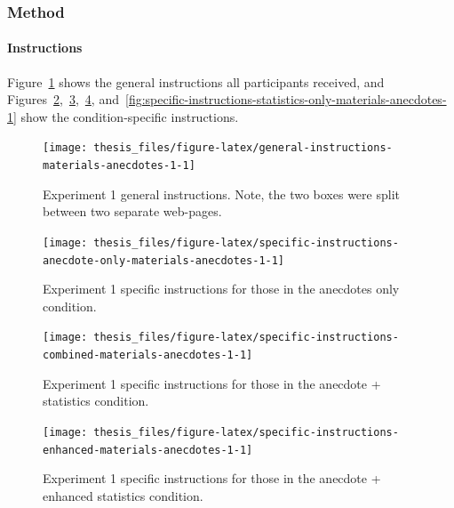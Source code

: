 \documentclass[a4paper, nobind, dvipsnames]{templates/ociamthesis}
\theoremstyle{definition}
\theoremstyle{definition}
\theoremstyle{definition}
\theoremstyle{definition}
\theoremstyle{remark}
\begin{document}
\subsubsection{Method}

\hypertarget{instructions-materials-anecdotes-1-appendix}{%
\paragraph{Instructions}\label{instructions-materials-anecdotes-1-appendix}}

Figure~\ref{fig:general-instructions-materials-anecdotes-1} shows the general
instructions all participants received, and
Figures~\ref{fig:specific-instructions-anecdote-only-materials-anecdotes-1},~\ref{fig:specific-instructions-combined-materials-anecdotes-1},~\ref{fig:specific-instructions-enhanced-materials-anecdotes-1},
and~\ref{fig:specific-instructions-statistics-only-materials-anecdotes-1} show
the condition-specific instructions.



\begin{figure}
\texttt{[image: thesis\_files/figure-latex/general-instructions-materials-anecdotes-1-1]} \caption{Experiment 1 general instructions. Note, the two boxes were split between two separate web-pages.}\label{fig:general-instructions-materials-anecdotes-1}
\end{figure}



\begin{figure}
\texttt{[image: thesis\_files/figure-latex/specific-instructions-anecdote-only-materials-anecdotes-1-1]} \caption{Experiment 1 specific instructions for those in the anecdotes only condition.}\label{fig:specific-instructions-anecdote-only-materials-anecdotes-1}
\end{figure}



\begin{figure}
\texttt{[image: thesis\_files/figure-latex/specific-instructions-combined-materials-anecdotes-1-1]} \caption{Experiment 1 specific instructions for those in the anecdote + statistics condition.}\label{fig:specific-instructions-combined-materials-anecdotes-1}
\end{figure}



\begin{figure}
\texttt{[image: thesis\_files/figure-latex/specific-instructions-enhanced-materials-anecdotes-1-1]} \caption{Experiment 1 specific instructions for those in the anecdote + enhanced statistics condition.}\label{fig:specific-instructions-enhanced-materials-anecdotes-1}
\end{figure}
\end{document}
